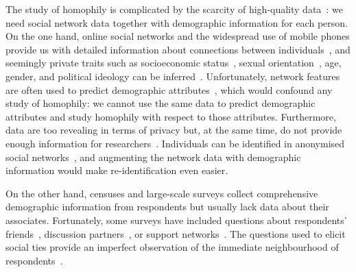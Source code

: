\documentclass{scrartcl}
\newcommand{\tah}[1]{\textbf{[TAH: #1]}}
\begin{document}
The study of homophily is complicated by the scarcity of high-quality data~\cite{Butts2012, Blumenstock2013}: we need social network data together with demographic information for each person. On the one hand, online social networks and the widespread use of mobile phones provide us with detailed information about connections between individuals~\cite{Golder2014}, and seemingly private traits such as socioeconomic status~\cite{Blumenstock2015, Luo2017}, sexual orientation~\cite{Wang2017}, age, gender, and political ideology can be inferred~\cite{Kosinski2013}. Unfortunately, network features are often used to predict demographic attributes~\cite{Wang2013,Blumenstock2015,Luo2017,Kosinski2013}, which would confound any study of homophily: we cannot use the same data to predict demographic attributes and study homophily with respect to those attributes. Furthermore, data are too revealing in terms of privacy but, at the same time, do not provide enough information for researchers~\cite{Golder2014}. Individuals can be identified in anonymised social networks~\cite{Backstrom2011, Narayanan2008}, and augmenting the network data with demographic information would make re-identification even easier.

On the other hand, censuses and large-scale surveys collect comprehensive demographic information from respondents but usually lack data about their associates. Fortunately, some surveys have included questions about respondents' friends~\cite{Huckfeldt1983, Johnson1989}, discussion partners~\cite{Marsden1987, McPherson2006}, or support networks~\cite{Kalmijn2007, Banerjee2013}. The questions used to elicit social ties provide an imperfect observation of the immediate neighbourhood of respondents~\cite{Marin2004,Eagle2015,Eveland-Jr.2017}.


\end{document}
